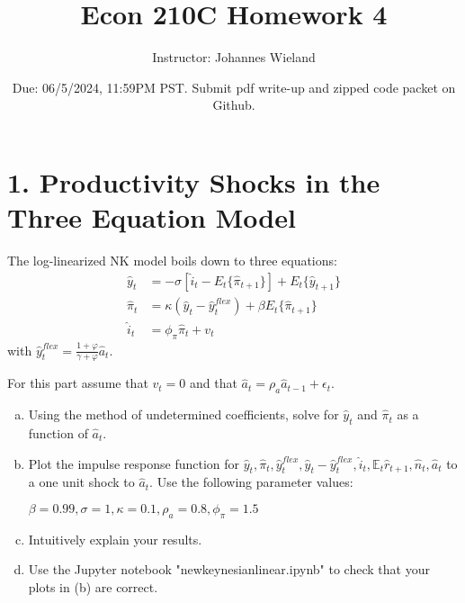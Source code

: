 \documentclass{article}
\newcommand{\E}{\mathbb{E}}
\newcommand{\1}{\mathbf{1}}
\begin{document}
\title{Econ 210C Homework 4}
\author{Instructor: Johannes Wieland}
\date{\color{red} Due: 06/5/2024, 11:59PM PST. Submit pdf write-up and zipped code packet on Github.}
\maketitle

\section*{1. Productivity Shocks in the Three Equation Model}
The log-linearized NK model boils down to three equations:
	\begin{align*}
		\hat{y}_t &=-\sigma[\hat{i}_t-E_t\{\hat{\pi}_{t+1}\}]+E_t\{\hat{y}_{t+1}\} \\
		\hat{\pi}_t&=\kappa (\hat{y}_t-\hat{y}_t^{flex}) +\beta E_t \{\hat{\pi}_{t+1}\} \\
		\hat{i}_t&=\phi_\pi\hat{\pi}_t+v_t 
	\end{align*}
with $\hat{y}_t^{flex}=\frac{1+\varphi}{\gamma+\varphi}\hat{a}_t$.
	
For this part assume that $v_t=0$ and that $\hat{a}_t = \rho_a \hat{a}_{t-1} + \epsilon_t$.

\begin{enumerate}[(a)]
	\item Using the method of undetermined coefficients, solve for $\hat{y}_t$ and $\hat{\pi}_t$ as a function of $\hat{a}_t$.
	\item Plot the impulse response function for $\hat{y}_t, \hat{\pi}_t,\hat{y}_t^{flex},\hat{y}_t-\hat{y}_t^{flex},\hat{i}_t,\E_t\hat{r}_{t+1},\hat{n}_{t},\hat{a}_t$ to a one unit shock to $\hat{a}_t$. Use the following parameter values:
	
	$\beta=0.99,\sigma=1,\kappa=0.1,\rho_a=0.8,\phi_\pi=1.5$
	\item Intuitively explain your results.
	\item Use the Jupyter notebook "newkeynesianlinear.ipynb" to check that your plots in (b) are correct.
\end{enumerate}
\end{document}
